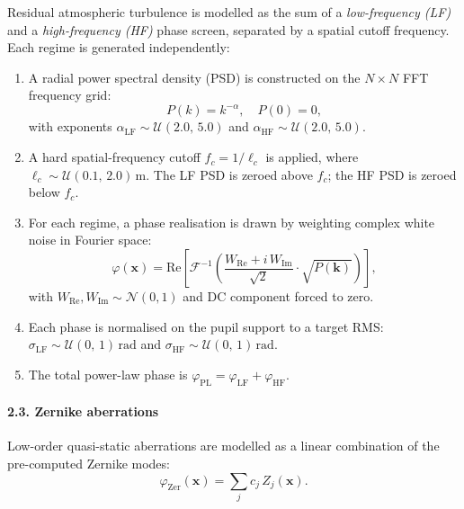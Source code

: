 \documentclass{aa}
\begin{document}
Residual atmospheric turbulence is modelled as the sum of a \emph{low-frequency (LF)} and a \emph{high-frequency (HF)} phase screen, separated by a spatial cutoff frequency. Each regime is generated independently:
\begin{enumerate}
    \item A radial power spectral density (PSD) is constructed on the $N \times N$ FFT frequency grid:
    \begin{equation}
    P(k) = k^{-\alpha}, \quad P(0) = 0,
    \end{equation}
    with exponents $\alpha_\mathrm{LF} \sim \mathcal{U}(2.0,\,5.0)$ and $\alpha_\mathrm{HF} \sim \mathcal{U}(2.0,\,5.0)$.

    \item A hard spatial-frequency cutoff $f_c = 1/\ell_c$ is applied, where $\ell_c \sim \mathcal{U}(0.1,\,2.0)\,\mathrm{m}$. The LF PSD is zeroed above $f_c$; the HF PSD is zeroed below $f_c$.

    \item For each regime, a phase realisation is drawn by weighting complex white noise in Fourier space:
    \begin{equation}
    \varphi(\mathbf{x}) = \mathrm{Re}\!\left[\mathcal{F}^{-1}\!\left(\frac{W_\mathrm{Re} + i\,W_\mathrm{Im}}{\sqrt{2}} \cdot \sqrt{P(\mathbf{k})}\right)\right],
    \end{equation}
    with $W_\mathrm{Re}, W_\mathrm{Im} \sim \mathcal{N}(0,1)$ and DC component forced to zero.

    \item Each phase is normalised on the pupil support to a target RMS: $\sigma_\mathrm{LF} \sim \mathcal{U}(0,\,1)\,\mathrm{rad}$ and $\sigma_\mathrm{HF} \sim \mathcal{U}(0,\,1)\,\mathrm{rad}$.

    \item The total power-law phase is $\varphi_\mathrm{PL} = \varphi_\mathrm{LF} + \varphi_\mathrm{HF}$.
\end{enumerate}

\paragraph{2.3. Zernike aberrations}

Low-order quasi-static aberrations are modelled as a linear combination of the pre-computed Zernike modes:
\begin{equation}
\varphi_\mathrm{Zer}(\mathbf{x}) = \sum_j c_j \, Z_j(\mathbf{x}).
\end{equation}
\end{document}
